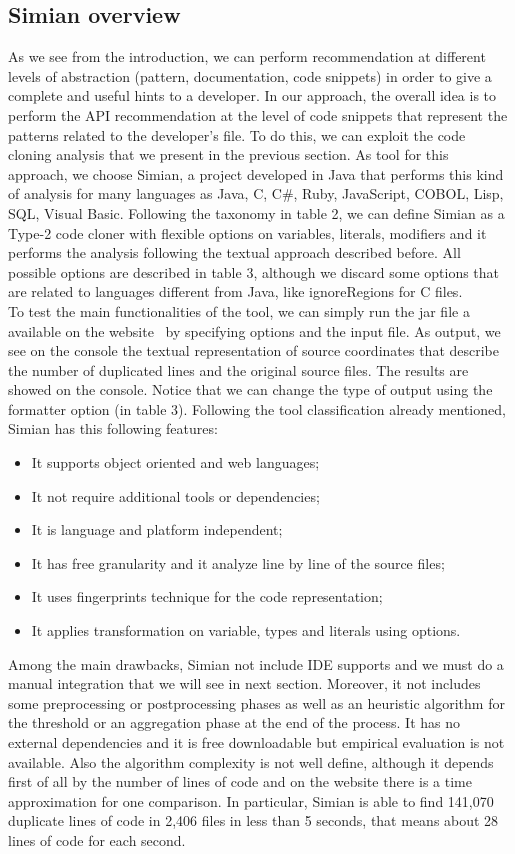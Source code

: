 \subsection{Simian overview}
As we see from the introduction, we can perform recommendation at different levels of abstraction (pattern, documentation, code snippets) in order to give a complete and useful hints to a developer. In our approach, the overall idea is to perform the API recommendation at the level of code snippets that represent the patterns related to the developer's file. To do this, we can exploit the code cloning analysis that we present in the previous section. As tool for this approach, we choose Simian, a project developed in Java that performs this kind of analysis for many languages as Java, C, C\#, Ruby, JavaScript, COBOL, Lisp, SQL, Visual Basic. Following the taxonomy in table 2, we can define Simian as a Type-2 code cloner with flexible options on variables, literals, modifiers and it performs the analysis following the textual approach described before. All possible options are described in table 3, although we discard some options that are related to languages different from Java, like ignoreRegions for C files. \\
To test the main functionalities of the tool, we can simply run the jar file a available on the website~\cite{https://www.harukizaemon.com/simian/_last_nodate} by specifying options and the input file. As output, we see on the console the textual representation of source coordinates that describe the number of duplicated lines and the original source files. The results are showed on the console. Notice that we can change the type of output using the formatter option (in table 3). 
Following the tool classification already mentioned, Simian has this following features: 
\begin{itemize}
\item It supports object oriented and web languages;
\item It not require additional tools or dependencies;
\item It is language and platform independent;
\item It has free granularity and it analyze line by line of the source files;
\item It uses fingerprints technique for the code representation;
\item It applies transformation on variable, types and literals using options.
\end{itemize}
Among the main drawbacks, Simian not include IDE supports and we must do a manual integration that we will see in next section. Moreover, it not includes some preprocessing or postprocessing phases as well as an heuristic algorithm for the threshold or an aggregation phase at the end of the process. It has no external dependencies and it is free downloadable but empirical evaluation is not available. Also the algorithm complexity is not well define, although it depends first of all by the number of lines of code and on the website there is a time approximation for one comparison. In particular, Simian is able to find 141,070 duplicate lines of code in 2,406 files in less than 5 seconds, that means about 28 lines of code for each second. 



